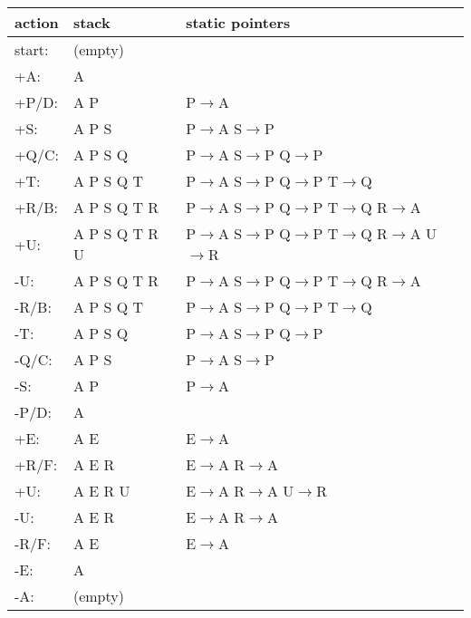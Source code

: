 \documentclass[12pt,letterpaper]{article}
\begin{document}
\begin{enumerate}
\begin{enumerate}
          \begin{tabular}{l l l}
            action & stack & static pointers \\
            \hline
            start: & (empty) & \\
            +A:    & A              & \\
            +P/D:  & A P            & P$\rightarrow$A \\
            +S:    & A P S          & P$\rightarrow$A S$\rightarrow$P \\
            +Q/C:  & A P S Q        & P$\rightarrow$A S$\rightarrow$P Q$\rightarrow$P \\
            +T:    & A P S Q T      & P$\rightarrow$A S$\rightarrow$P Q$\rightarrow$P T$\rightarrow$Q \\
            +R/B:  & A P S Q T R    & P$\rightarrow$A S$\rightarrow$P Q$\rightarrow$P T$\rightarrow$Q R$\rightarrow$A \\
            +U:    & A P S Q T R U  & P$\rightarrow$A S$\rightarrow$P Q$\rightarrow$P T$\rightarrow$Q R$\rightarrow$A U$\rightarrow$R \\
            -U:    & A P S Q T R    & P$\rightarrow$A S$\rightarrow$P Q$\rightarrow$P T$\rightarrow$Q R$\rightarrow$A \\
            -R/B:  & A P S Q T      & P$\rightarrow$A S$\rightarrow$P Q$\rightarrow$P T$\rightarrow$Q \\
            -T:    & A P S Q        & P$\rightarrow$A S$\rightarrow$P Q$\rightarrow$P \\
            -Q/C:  & A P S          & P$\rightarrow$A S$\rightarrow$P \\
            -S:    & A P            & P$\rightarrow$A \\
            -P/D:  & A              & \\
            +E:    & A E            & E$\rightarrow$A \\
            +R/F:  & A E R          & E$\rightarrow$A R$\rightarrow$A \\
            +U:    & A E R U        & E$\rightarrow$A R$\rightarrow$A U$\rightarrow$R \\
            -U:    & A E R          & E$\rightarrow$A R$\rightarrow$A \\
            -R/F:  & A E            & E$\rightarrow$A \\
            -E:    & A              & \\
            -A:    & (empty)        & \\
          \end{tabular}


\end{enumerate}
\end{enumerate}
\end{document}
